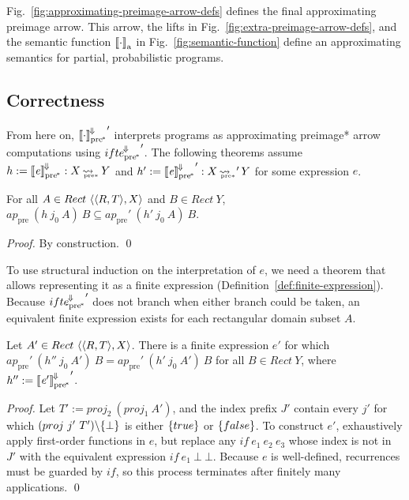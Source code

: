 \documentclass{llncs}
\newcommand{\figref}[1]{Fig.~\ref{#1}}
\newcommand{\arrow}{\rightsquigarrow}
\newcommand{\conv}{^{\mspace{-2mu}\Downarrow\mspace{-2mu}}}
\newcommand{\meaningofconv}[1]{\left\llbracket{#1}\right\rrbracket\conv}
\newcommand{\arrowconvif}{\ensuremath{ifte\conv}}
\newcommand{\gen}{_\mathrm{a}}
\newcommand{\pre}{_\mathrm{pre}}
\newcommand{\ppre}{_\mathrm{pre^{\mspace{-2mu}*}}}
\DeclareMathOperator{\ppreto}{\arrow_{\mspace{-19mu}_{\mathrm{pre*}}}}
\newcommand{\convifppre}{\arrowconvif\ppre}
\begin{document}
\figref{fig:approximating-preimage-arrow-defs} defines the final approximating preimage arrow.
This arrow, the lifts in \figref{fig:extra-preimage-arrow-defs}, and the semantic function $\meaningof{\cdot}\gen$ in \figref{fig:semantic-function} define an approximating semantics for partial, probabilistic programs.

\subsection{Correctness}

From here on, ${\meaningof{\cdot}\conv\ppre}'$ interprets programs as approximating preimage* arrow computations using ${\convifppre}'$.
The following theorems assume $h := \meaningofconv{\mathit{e}}\ppre : X \ppreto Y$ and $h' := {\meaningofconv{\mathit{e}}\ppre}' : X \ppreto' Y$ for some expression $\mathit{e}$.

\begin{theorem}[soundness]
\label{thm:approximation}
For all $A \in Rect~\langle{\langle{R,T}\rangle,X}\rangle$ and $B \in Rect~Y$, $ap\pre~(h~j_0~A)~B \subseteq ap\pre'~(h'~j_0~A)~B$.%
\end{theorem}
\begin{proof}
By construction.
\qed
\end{proof}

To use structural induction on the interpretation of $\mathit{e}$, we need a theorem that allows representing it as a finite expression (Definition~\ref{def:finite-expression}).
Because ${\convifppre}'$ does not branch when either branch could be taken, an equivalent finite expression exists for each rectangular domain subset $A$.

\begin{theorem}
\label{thm:equivalent-finite-expression}
Let $A' \in Rect~\langle{\langle{R,T}\rangle,X}\rangle$.
There is a finite expression $\mathit{e'}$ for which $ap\pre'~(h''~j_0~A')~B = ap\pre'~(h'~j_0~A')~B$ for all $B \in Rect~Y$, where $h'' := {\meaningofconv{\mathit{e'}}\ppre}'$.%
\end{theorem}
\begin{proof}
Let $T' := proj_2~(proj_1~A')$, and the index prefix $J'$ contain every $j'$ for which $(proj~j'~T') \backslash \{{\bot}\}$ is either $\{{true}\}$ or $\{{false}\}$.
To construct $\mathit{e'}$, exhaustively apply first-order functions in $\mathit{e}$, but replace any $if~\mathit{e}_1~\mathit{e}_2~\mathit{e}_3$ whose index is not in $J'$ with the equivalent expression $if~\mathit{e}_1~\bot~\bot$.
Because $\mathit{e}$ is well-defined, recurrences must be guarded by $if$, so this process terminates after finitely many applications.
\qed
\end{proof}
\end{document}

